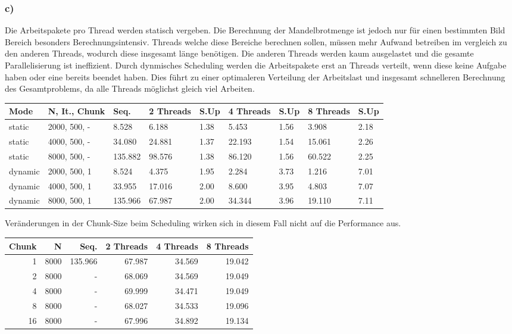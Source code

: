 \documentclass{article}
\begin{document}
		\subsubsection{c)}
			Die Arbeitspakete pro Thread werden statisch vergeben. 
			Die Berechnung der Mandelbrotmenge ist jedoch nur für einen bestimmten Bild Bereich besonders Berechnungsintensiv. 
			Threads welche diese Bereiche berechnen sollen, müssen mehr Aufwand betreiben im vergleich zu den anderen Threads, wodurch diese insgesamt länge benötigen.
			Die anderen Threads werden kaum ausgelastet und die gesamte Parallelisierung ist ineffizient.
			Durch dynmisches Scheduling werden die Arbeitspakete erst an Threads verteilt, wenn diese keine Aufgabe haben oder eine bereits beendet haben.
			Dies führt zu einer optimaleren Verteilung der Arbeitslast und insgesamt schnelleren Berechnung des Gesamtproblems, da alle Threads möglichst gleich viel Arbeiten.
	
			\begin{center}
				\begin{tabular}{|p{1.5cm}|p{2cm}|p{1cm}|p{1cm}|p{1cm}|p{1cm}|p{1cm}|p{1cm}|p{1cm}|}
					\hline
					Mode & N, It., Chunk & Seq. & 2 Threads & S.Up & 4 Threads & S.Up & 8 Threads & S.Up \\
					\hline
					static & 2000, 500, - & 8.528  & 6.188  & 1.38 & 5.453  & 1.56 & 3.908  & 2.18\\
					static & 4000, 500, - & 34.080  & 24.881  & 1.37 & 22.193  & 1.54 & 15.061  & 2.26 \\
					static & 8000, 500, - & 135.882  & 98.576  & 1.38 & 86.120  & 1.56  & 60.522  & 2.25 \\
					\hline
					dynamic & 2000, 500, 1 & 8.524  & 4.375  & 1.95 & 2.284 & 3.73 & 1.216 & 7.01 \\
					dynamic & 4000, 500, 1 & 33.955  & 17.016 & 2.00 & 8.600 & 3.95 & 4.803 & 7.07 \\
					dynamic & 8000, 500, 1 & 135.966  & 67.987 & 2.00 & 34.344 & 3.96 & 19.110 & 7.11 \\
					\hline
				\end{tabular}
			\end{center}
			
			Veränderungen in der Chunk-Size beim Scheduling wirken sich in diesem Fall nicht auf die Performance aus.
			
			\begin{center}
				\begin{tabular}{|r|r|r|r|r|r|}
					\hline
					Chunk & N & Seq. & 2 Threads & 4 Threads & 8 Threads \\
					\hline
					1 & 8000 & 135.966 & 67.987  & 34.569  & 19.042  \\
					\hline
					2 & 8000 & - & 68.069 & 34.569  & 19.049  \\
					\hline
					4 & 8000 & - & 69.999  & 34.471  & 19.049  \\
					\hline
					8 & 8000 & - & 68.027  & 34.533  & 19.096  \\
					\hline
					16 & 8000 & - & 67.996  & 34.892  & 19.134  \\
					\hline
				\end{tabular}
			\end{center}
\end{document}
